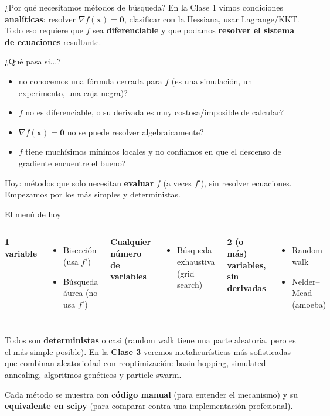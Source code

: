 \documentclass[aspectratio=169,10pt]{beamer}
\newcommand{\grad}{\nabla}
\newcommand{\x}{\mathbf{x}}
\begin{document}
\begin{frame}{¿Por qué necesitamos métodos de búsqueda?}
  En la Clase 1 vimos condiciones \textbf{analíticas}: resolver
  $\grad f(\x)=\mathbf 0$, clasificar con la Hessiana, usar Lagrange/KKT.
  Todo eso requiere que $f$ sea \textbf{diferenciable} y que podamos
  \textbf{resolver el sistema de ecuaciones} resultante.
  \begin{alertblock}{¿Qué pasa si...?}
    \begin{itemize}
      \item no conocemos una fórmula cerrada para $f$ (es una simulación,
        un experimento, una caja negra)?
      \item $f$ no es diferenciable, o su derivada es muy costosa/imposible
        de calcular?
      \item $\grad f(\x)=\mathbf 0$ no se puede resolver algebraicamente?
      \item $f$ tiene muchísimos mínimos locales y no confiamos en que el
        descenso de gradiente encuentre el bueno?
    \end{itemize}
  \end{alertblock}
  Hoy: métodos que solo necesitan \textbf{evaluar} $f$ (a veces $f'$), sin
  resolver ecuaciones. Empezamos por los más simples y deterministas.
\end{frame}

\begin{frame}{El menú de hoy}
  \begin{columns}
    \textbf{1 variable}
    \begin{itemize}
      \item Bisección (usa $f'$)
      \item Búsqueda áurea (no usa $f'$)
    \end{itemize}
    \vspace{0.3cm}
    \textbf{Cualquier número de variables}
    \begin{itemize}
      \item Búsqueda exhaustiva (grid search)
    \end{itemize}
    \textbf{2 (o más) variables, sin derivadas}
    \begin{itemize}
      \item Random walk
      \item Nelder--Mead (amoeba)
    \end{itemize}
  \end{columns}
  \vspace{0.4cm}
  \begin{block}{}
    Todos son \textbf{deterministas} o casi (random walk tiene una parte
    aleatoria, pero es el más simple posible). En la \textbf{Clase 3}
    veremos metaheurísticas más sofisticadas que combinan aleatoriedad
    con reoptimización: basin hopping, simulated annealing, algoritmos
    genéticos y particle swarm.
  \end{block}
  \small Cada método se muestra con \textbf{código manual} (para entender
  el mecanismo) y su \textbf{equivalente en scipy} (para comparar contra
  una implementación profesional).
\end{frame}
\end{document}
